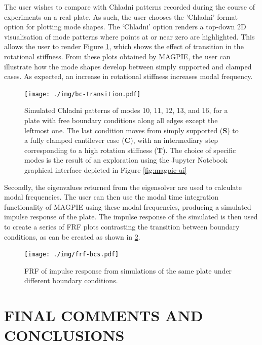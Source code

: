The user wishes to compare with Chladni patterns recorded during the course of experiments on a real plate. As such, the user chooses the 'Chladni' format option for plotting mode shapes. The `Chladni' option renders a top-down 2D visualisation of mode patterns where points at or near zero are highlighted. This allows the user to render Figure \ref{fig:bc_transitions}, which shows the effect of transition in the rotational stiffness.  From these plots obtained by MAGPIE, the user can illustrate how the mode shapes develop between simply supported and clamped cases. As expected, an increase in rotational stiffness increases modal frequency.
\begin{figure}[H]
    \centering
    \texttt{[image: ./img/bc-transition.pdf]}
    \caption{Simulated Chladni patterns of modes 10, 11, 12, 13, and 16, for a plate with free boundary conditions along all edges except the leftmost one. The last condition moves from simply supported (\textbf{S}) to a fully clamped cantilever case (\textbf{C}), with an intermediary step corresponding to a high rotation stiffness (\textbf{T}). The choice of specific modes is the result of an exploration using the Jupyter Notebook graphical interface depicted in Figure \ref{fig:magpie-ui} }
    \label{fig:bc_transitions}
\end{figure}
Secondly, the eigenvalues returned from the eigensolver are used to calculate modal frequencies. The user can then use the modal time integration functionality of MAGPIE using these modal frequencies, producing a simulated impulse response of the plate. The impulse response of the simulated is then used to create a series of FRF plots contrasting the transition between boundary conditions, as can be created as shown in \ref{fig:frf-bcs}.
\begin{figure}[H]
    \centering
    \texttt{[image: ./img/frf-bcs.pdf]}
    \caption{FRF of impulse response from simulations of the same plate under different boundary conditions.}
    \label{fig:frf-bcs}
\end{figure}

\section{FINAL COMMENTS AND CONCLUSIONS}\label{sec:Conclusions}

  
